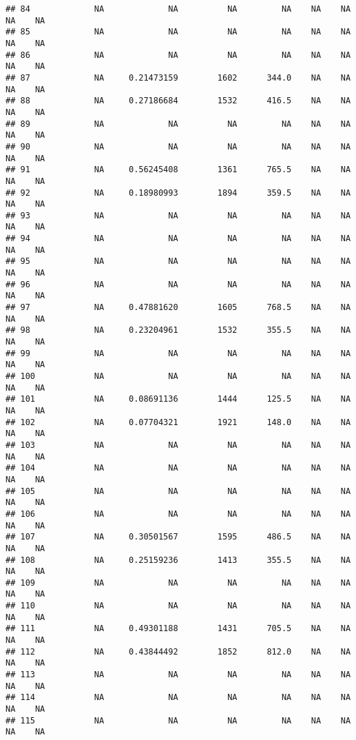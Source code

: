 \documentclass[]{article}
\begin{document}
\begin{verbatim}
## 84             NA             NA          NA         NA    NA    NA    NA    NA
## 85             NA             NA          NA         NA    NA    NA    NA    NA
## 86             NA             NA          NA         NA    NA    NA    NA    NA
## 87             NA     0.21473159        1602      344.0    NA    NA    NA    NA
## 88             NA     0.27186684        1532      416.5    NA    NA    NA    NA
## 89             NA             NA          NA         NA    NA    NA    NA    NA
## 90             NA             NA          NA         NA    NA    NA    NA    NA
## 91             NA     0.56245408        1361      765.5    NA    NA    NA    NA
## 92             NA     0.18980993        1894      359.5    NA    NA    NA    NA
## 93             NA             NA          NA         NA    NA    NA    NA    NA
## 94             NA             NA          NA         NA    NA    NA    NA    NA
## 95             NA             NA          NA         NA    NA    NA    NA    NA
## 96             NA             NA          NA         NA    NA    NA    NA    NA
## 97             NA     0.47881620        1605      768.5    NA    NA    NA    NA
## 98             NA     0.23204961        1532      355.5    NA    NA    NA    NA
## 99             NA             NA          NA         NA    NA    NA    NA    NA
## 100            NA             NA          NA         NA    NA    NA    NA    NA
## 101            NA     0.08691136        1444      125.5    NA    NA    NA    NA
## 102            NA     0.07704321        1921      148.0    NA    NA    NA    NA
## 103            NA             NA          NA         NA    NA    NA    NA    NA
## 104            NA             NA          NA         NA    NA    NA    NA    NA
## 105            NA             NA          NA         NA    NA    NA    NA    NA
## 106            NA             NA          NA         NA    NA    NA    NA    NA
## 107            NA     0.30501567        1595      486.5    NA    NA    NA    NA
## 108            NA     0.25159236        1413      355.5    NA    NA    NA    NA
## 109            NA             NA          NA         NA    NA    NA    NA    NA
## 110            NA             NA          NA         NA    NA    NA    NA    NA
## 111            NA     0.49301188        1431      705.5    NA    NA    NA    NA
## 112            NA     0.43844492        1852      812.0    NA    NA    NA    NA
## 113            NA             NA          NA         NA    NA    NA    NA    NA
## 114            NA             NA          NA         NA    NA    NA    NA    NA
## 115            NA             NA          NA         NA    NA    NA    NA    NA

\end{verbatim}
\end{document}
